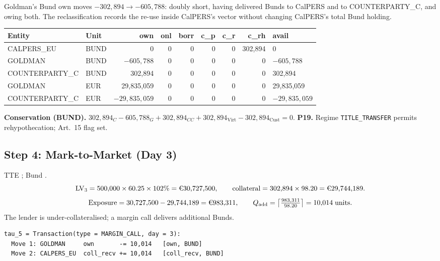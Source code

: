 \noindent Goldman's Bund $\mathrm{own}$ moves $-302{,}894 \to -605{,}788$: doubly short, having delivered Bunds to CalPERS and to COUNTERPARTY\_C, and owing both. The reclassification records the re-use inside CalPERS's vector without changing CalPERS's total Bund holding.

\begin{center}\small
\begin{tabular}{l l r r r r r r l}
\toprule
\textbf{Entity} & \textbf{Unit} & own & onl & borr & c\_p & c\_r & c\_rh & avail \\
\midrule
CALPERS\_EU & BUND & 0 & 0 & 0 & 0 & 0 & 302{,}894 & 0 \\
GOLDMAN & BUND & $-605{,}788$ & 0 & 0 & 0 & 0 & 0 & $-605{,}788$ \\
COUNTERPARTY\_C & BUND & 302{,}894 & 0 & 0 & 0 & 0 & 0 & 302{,}894 \\
GOLDMAN & EUR & 29{,}835{,}059 & 0 & 0 & 0 & 0 & 0 & 29{,}835{,}059 \\
COUNTERPARTY\_C & EUR & $-29{,}835{,}059$ & 0 & 0 & 0 & 0 & 0 & $-29{,}835{,}059$ \\
\bottomrule
\end{tabular}
\end{center}

\noindent\textbf{Conservation (BUND).} $302{,}894_C - 605{,}788_G + 302{,}894_{CC} + 302{,}894_{\mathrm{Virt}} - 302{,}894_{\mathrm{Cust}} = 0$. \checkmark\quad
\textbf{P19.} Regime \texttt{TITLE\_TRANSFER} permits rehypothecation; Art.~15 flag set. \checkmark

\subsection{Step 4: Mark-to-Market (Day 3)}
\label{sec:eu-step4}

TTE ; Bund .
\[
\mathrm{LV}_3 = 500{,}000 \times 60.25 \times 102\% = \text{\EUR{30,727,500}}, \qquad
\text{collateral} = 302{,}894 \times 98.20 = \text{\EUR{29,744,189}}.
\]
\[
\text{Exposure} = 30{,}727{,}500 - 29{,}744{,}189 = \text{\EUR{983,311}}, \qquad
Q_{\mathrm{add}} = \left\lceil \tfrac{983{,}311}{98.20} \right\rceil = 10{,}014 \;\text{units}.
\]
The lender is under-collateralised; a margin call delivers additional Bunds.

\begin{lstlisting}
tau_5 = Transaction(type = MARGIN_CALL, day = 3):
  Move 1: GOLDMAN     own       -= 10,014   [own, BUND]
  Move 2: CALPERS_EU  coll_recv += 10,014   [coll_recv, BUND]
\end{lstlisting}

